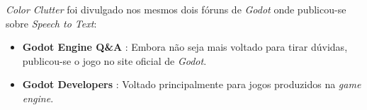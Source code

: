 \textit{Color Clutter} foi divulgado nos mesmos dois fóruns de \textit{Godot} onde publicou-se sobre \textit{Speech to Text}:

\begin{itemize}
\item \textbf{Godot Engine Q\&A} \citep{colorClutterGodotQA}: Embora não seja mais voltado para tirar dúvidas, publicou-se o jogo no site oficial de \textit{Godot}.

\item \textbf{Godot Developers} \citep{colorClutterGodotDevelopers}: Voltado principalmente para jogos produzidos na \textit{game engine}.
\end{itemize}
